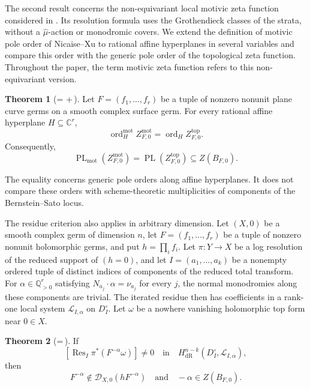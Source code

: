 \documentclass[12pt]{amsart}
\numberwithin{equation}{section}
\theoremstyle{plain}
\theoremstyle{definition}
\theoremstyle{remark}
\theoremstyle{definition}
\newtheorem{maintheorem}{Theorem}
\DeclareMathOperator{\PL}{PL}
\DeclareMathOperator{\Res}{Res}
\DeclareMathOperator{\ord}{ord}
\newcommand{\C}{\mathbb C}
\newcommand{\Q}{\mathbb Q}
\newcommand{\D}{\mathscr D}
\newcommand{\Lcal}{\mathscr L}
\begin{document}
The second result concerns the non-equivariant local motivic zeta function considered in . Its resolution formula uses the Grothendieck classes of the strata, without a $\widehat\mu$-action or monodromic covers. We extend the definition of motivic pole order of Nicaise--Xu \cite[Remark~3.7]{NicaiseXu2016} to rational affine hyperplanes in several variables and compare this order with the generic pole order of the topological zeta function. Throughout the paper, the term motivic zeta function refers to this non-equivariant version.

\begin{maintheorem}[{=\,\,+\,}]\label{thm:motivic-intro}
Let $F=(f_1,\ldots,f_r)$ be a tuple of nonzero nonunit plane curve germs on a smooth complex surface germ. For every rational affine hyperplane $H\subseteq\C^r$,
\[
\ord_H^{\mathrm{mot}}Z^{\mathrm{mot}}_{F,0}=\ord_HZ^{\mathrm{top}}_{F,0}.
\]
Consequently,
\[
\PL_{\mathrm{mot}}(Z^{\mathrm{mot}}_{F,0})=\PL(Z^{\mathrm{top}}_{F,0})\subseteq Z(B_{F,0}).
\]
\end{maintheorem}

The equality concerns generic pole orders along affine hyperplanes. It does not compare these orders with scheme-theoretic multiplicities of components of the Bernstein--Sato locus.

The residue criterion also applies in arbitrary dimension. Let $(X,0)$ be a smooth complex germ of dimension $n$, let $F=(f_1,\ldots,f_r)$ be a tuple of nonzero nonunit holomorphic germs, and put $h=\prod_i f_i$. Let $\pi:Y\to X$ be a log resolution of the reduced support of $(h=0)$, and let $I=(a_1,\ldots,a_k)$ be a nonempty ordered tuple of distinct indices of components of the reduced total transform. For $\alpha\in\Q_{>0}^r$ satisfying $N_{a_j}\cdot\alpha=\nu_{a_j}$ for every $j$, the normal monodromies along these components are trivial. The iterated residue then has coefficients in a rank-one local system $\Lcal_{I,\alpha}$ on $D_I^\circ$. Let $\omega$ be a nowhere vanishing holomorphic top form near $0\in X$.

\begin{maintheorem}[{=\,}]\label{thm:iterated-intro}
If
\[
[\Res_I\pi^*(F^{-\alpha}\omega)]\ne0
\quad\text{in}\quad
H^{n-k}_{\mathrm{dR}}(D_I^\circ,\Lcal_{I,\alpha}),
\]
then
\[
F^{-\alpha}\notin\D_{X,0}(hF^{-\alpha})
\quad\text{and}\quad
-\alpha\in Z(B_{F,0}).
\]
\end{maintheorem}
\end{document}
